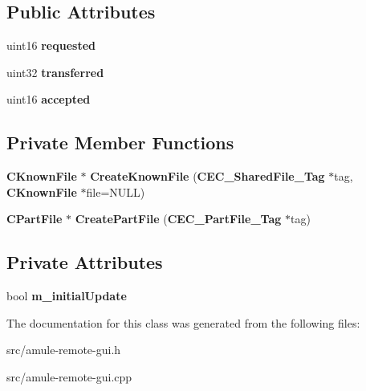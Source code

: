 \subsection*{Public Attributes}
\begin{DoxyCompactItemize}
\item 
uint16 {\bfseries requested}\label{classCKnownFilesRem_ae2ae3164ccbd0fbed950ba879fad7602}

\item 
uint32 {\bfseries transferred}\label{classCKnownFilesRem_a99ed989c9a25507ef0ea4ce20354544e}

\item 
uint16 {\bfseries accepted}\label{classCKnownFilesRem_a7d9ea6ca326e30942cfdf035537985d3}

\end{DoxyCompactItemize}
\subsection*{Private Member Functions}
\begin{DoxyCompactItemize}
\item 
{\bf CKnownFile} $\ast$ {\bfseries CreateKnownFile} ({\bf CEC\_\-SharedFile\_\-Tag} $\ast$tag, {\bf CKnownFile} $\ast$file=NULL)\label{classCKnownFilesRem_a401d39d29d6fab143b0a78c2aa8e28ba}

\item 
{\bf CPartFile} $\ast$ {\bfseries CreatePartFile} ({\bf CEC\_\-PartFile\_\-Tag} $\ast$tag)\label{classCKnownFilesRem_a318e4e2dfd04ac5bad4c00605fd94c9e}

\end{DoxyCompactItemize}
\subsection*{Private Attributes}
\begin{DoxyCompactItemize}
\item 
bool {\bfseries m\_\-initialUpdate}\label{classCKnownFilesRem_ade34a3856ecb9018da98c400e499a258}

\end{DoxyCompactItemize}


The documentation for this class was generated from the following files:\begin{DoxyCompactItemize}
\item 
src/amule-\/remote-\/gui.h\item 
src/amule-\/remote-\/gui.cpp\end{DoxyCompactItemize}
